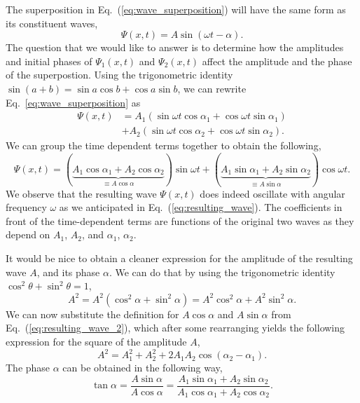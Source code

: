 The superposition in Eq.~(\ref{eq:wave_superposition}) will have the same form as its constituent waves,
\begin{equation}
    \Psi(x,t) = A \sin (\omega t-\alpha).
    \label{eq:resulting_wave}
\end{equation}
The question that we would like to answer is to determine how the amplitudes and initial phases of $\Psi_1(x,t)$ and $\Psi_2(x,t)$ affect the amplitude and the phase of the superpostion.
Using the trigonometric identity $\sin (a + b)=\sin a \cos b +\cos a \sin b$, we can rewrite Eq.~\ref{eq:wave_superposition} as
\begin{align}
    \Psi(x,t) & = A_1 \left( \sin\omega t \cos\alpha_1 + \cos\omega t \sin \alpha_1 \right) \nonumber\\
    & + A_2 \left( \sin\omega t \cos\alpha_2 + \cos\omega t \sin\alpha_2 \right).
\end{align}
We can group the time dependent terms together to obtain the following, 
\begin{equation}
    \Psi(x,t) = ( \underbrace{A_1 \cos\alpha_1 + A_2 \cos\alpha_2}_{\equiv A\cos\alpha} ) \sin \omega t + ( \underbrace{A_1 \sin\alpha_1 + A_2 \sin\alpha_2}_{\equiv A\sin\alpha} ) \cos \omega t.
    \label{eq:resulting_wave_2}
\end{equation}
We observe that the resulting wave $\Psi(x,t)$ does indeed oscillate with angular frequency $\omega$ as we anticipated in Eq.~(\ref{eq:resulting_wave}).
The coefficients in front of the time-dependent terms are functions of the original two waves as they depend on $A_1$, $A_2$, and $\alpha_1$, $\alpha_2$.

It would be nice to obtain a cleaner expression for the amplitude of the resulting wave $A$, and its phase $\alpha$.
We can do that by using the trigonometric identity $\cos^2\theta + \sin^2\theta=1$,
\begin{equation}
    A^2 = A^2 (\cos^2\alpha + \sin^2\alpha) = A^2\cos^2\alpha + A^2 \sin^2\alpha.
\end{equation}
We can now substitute the definition for $A\cos\alpha$ and $A\sin\alpha$ from Eq.~(\ref{eq:resulting_wave_2}), which after some rearranging yields the following expression for the square of the amplitude $A$,
\begin{equation}
    A^2 = A_1^2 + A_2^2 + 2 A_1 A_2 \cos(\alpha_2-\alpha_1).
    \label{eq:superposition-amplitude}
\end{equation}
The phase $\alpha$ can be obtained in the following way,
\begin{equation}
    \tan \alpha = \frac{A\sin\alpha}{A\cos\alpha} = \frac{A_1\sin\alpha_1 + A_2\sin\alpha_2}{A_1\cos\alpha_1 + A_2\cos\alpha_2}.
    \label{eq:superposition-alpha}
\end{equation}

